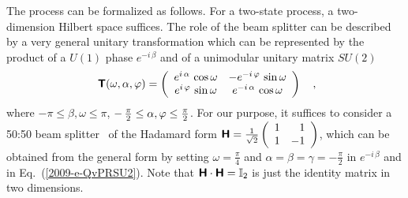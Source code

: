 \documentclass[10pt]{article}%
\begin{document}
The process can be formalized as follows.
For a two-state process, a two-dimension Hilbert space suffices.
The role of the beam splitter can be described by a very general unitary transformation
which
can be represented by the product of a $U(1)$ phase $e^{-i\,\beta}$ and
of a unimodular unitary
matrix $SU(2)$~\cite{murnaghan}
\begin{equation}
\textsf{\textbf{ T}} (\omega ,\alpha ,\varphi )=
\left(
\begin{array}{cc}
{e^{i\,\alpha }}\,\cos \omega
&
{-e^{-i\,\varphi }}\,\sin \omega
\\
{e^{i\,\varphi }}\,\sin \omega
&
{e^{-i\,\alpha }}\,\cos \omega
 \end{array}
\right)
 \quad ,
\label{2009-e-QvPRSU2}
\end{equation}
where $-\pi \le \beta ,\omega \le \pi$,
$-\, {\pi \over 2} \le  \alpha ,\varphi \le {\pi \over 2}$.
For our purpose, it suffices to consider a 50:50 beam splitter~\cite{Mandel-Ou1987118,green-horn-zei,zeilinger:882,svozil-2004-analog}
of the Hadamard form
$
\textsf{\textbf{H}}= {1\over \sqrt{2}}
\left(
\begin{array}{rr}
1&1\\
1&-1
\end{array}
\right)$, which can be obtained from the general form by setting  $\omega =\frac{\pi}{4}$  and
$\alpha = \beta = \gamma =-\frac{\pi}{2}$  in $e^{-i\,\beta}$ and in Eq.~(\ref{2009-e-QvPRSU2}).
Note that $\textsf{\textbf{H}} \cdot \textsf{\textbf{H}} = \mathbb{I}_2$ is just the identity matrix in two dimensions.
\end{document}
